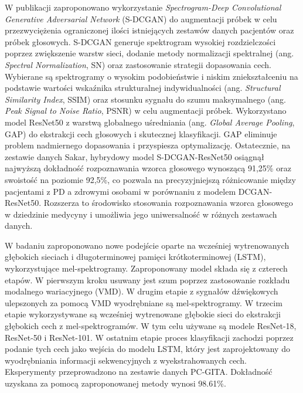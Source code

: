 W publikacji \cite{9257451}  zaproponowano  wykorzystanie \emph{Spectrogram-Deep Convolutional Generative Adversarial Network} (S-DCGAN)
do augmentacji próbek w celu przezwyciężenia ograniczonej ilości istniejących zestawów danych pacjentów oraz próbek głosowych.
S-DCGAN generuje spektrogram wysokiej rozdzielczości poprzez zwiększenie warstw sieci, dodanie metody normalizacji spektralnej (ang. \emph{Spectral Normalization}, SN) oraz
zastosowanie strategii dopasowania cech.
Wybierane są spektrogramy o wysokim podobieństwie i niskim zniekształceniu na podstawie wartości wskaźnika strukturalnej
indywidualności (ang. \emph{Structural Similarity Index}, SSIM) oraz stosunku sygnału do szumu maksymalnego (ang. \emph{Peak Signal to Noise Ratio}, PSNR)
w celu augmentacji próbek.
Wykorzystano model ResNet50 z warstwą globalnego uśredniania (ang. \emph{Global Average Pooling}, GAP) do ekstrakcji cech głosowych i skutecznej
klasyfikacji.
GAP eliminuje problem nadmiernego dopasowania i przyspiesza optymalizację.
Ostatecznie, na zestawie danych Sakar, hybrydowy model S-DCGAN-ResNet50 osiągnął najwyższą dokładność rozpoznawania wzorca głosowego wynoszącą 91,25\%
oraz swoistość na poziomie 92,5\%, co pozwala na precyzyjniejszą różnicowanie między pacjentami z PD a zdrowymi osobami w porównaniu z modelem
DCGAN-ResNet50.
Rozszerza to środowisko stosowania rozpoznawania wzorca głosowego w dziedzinie medycyny i umożliwia jego uniwersalność w różnych
zestawach danych.

W badaniu \cite{ER2021103006} zaproponowano nowe podejście oparte na wcześniej wytrenowanych głębokich sieciach i długoterminowej pamięci krótkoterminowej (LSTM),
wykorzystujące mel-spektrogramy.
Zaproponowany model składa się z czterech etapów.
W pierwszym kroku usuwany jest szum  poprzez zastosowanie rozkładu modalnego wariacyjnego (VMD).
W drugim etapie z sygnałów dźwiękowych ulepszonych za pomocą VMD wyodrębniane są mel-spektrogramy.
W trzecim etapie wykorzystywane są wcześniej wytrenowane głębokie sieci do ekstrakcji głębokich cech z mel-spektrogramów.
W tym celu używane są modele ResNet-18, ResNet-50 i ResNet-101.
W ostatnim etapie proces klasyfikacji zachodzi poprzez podanie tych cech jako wejścia do modelu LSTM, który jest zaprojektowany do wyodrębniania
informacji sekwencyjnych z wyekstrahowanych cech.
Eksperymenty przeprowadzono na zestawie danych PC-GITA.
Dokładność uzyskana za pomocą zaproponowanej metody wynosi 98.61\%.




